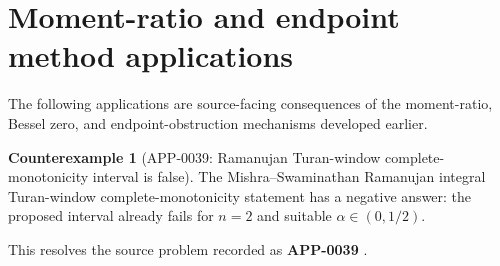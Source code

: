 \documentclass[11pt]{article}
\numberwithin{equation}{section}
\theoremstyle{definition}
\newtheorem{counterexample}[theorem]{Counterexample}
\theoremstyle{remark}
\newcommand{\1}{\mathbf 1}
\begin{document}
\section{Moment-ratio and endpoint method applications}
\label{sec:moment-ratio-endpoint-method-applications}



The following applications are source-facing consequences of the moment-ratio, Bessel zero, and endpoint-obstruction mechanisms developed earlier.

\begin{counterexample}[APP-0039: Ramanujan Turan-window complete-monotonicity interval is false]
\label{res:ramanujan-turan-window-negative-answer}
The Mishra--Swaminathan Ramanujan integral Turan-window complete-monotonicity statement has a negative answer: the proposed interval already fails for \(n=2\) and suitable \(\alpha\in(0,1/2)\).



This resolves the source problem recorded as \textbf{APP-0039} \cite{mishra-swaminathan-ramanujan}.
\end{counterexample}
\end{document}
